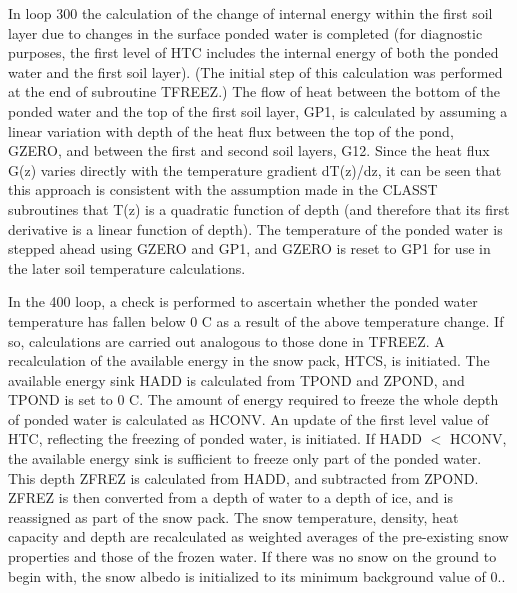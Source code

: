 In loop 300 the calculation of the change of internal energy within the first soil layer due to changes in the surface ponded water is completed (for diagnostic purposes, the first level of H\+T\+C includes the internal energy of both the ponded water and the first soil layer). (The initial step of this calculation was performed at the end of subroutine T\+F\+R\+E\+E\+Z.) The flow of heat between the bottom of the ponded water and the top of the first soil layer, G\+P1, is calculated by assuming a linear variation with depth of the heat flux between the top of the pond, G\+Z\+E\+R\+O, and between the first and second soil layers, G12. Since the heat flux G(z) varies directly with the temperature gradient d\+T(z)/dz, it can be seen that this approach is consistent with the assumption made in the C\+L\+A\+S\+S\+T subroutines that T(z) is a quadratic function of depth (and therefore that its first derivative is a linear function of depth). The temperature of the ponded water is stepped ahead using G\+Z\+E\+R\+O and G\+P1, and G\+Z\+E\+R\+O is reset to G\+P1 for use in the later soil temperature calculations.

In the 400 loop, a check is performed to ascertain whether the ponded water temperature has fallen below 0 C as a result of the above temperature change. If so, calculations are carried out analogous to those done in T\+F\+R\+E\+E\+Z. A recalculation of the available energy in the snow pack, H\+T\+C\+S, is initiated. The available energy sink H\+A\+D\+D is calculated from T\+P\+O\+N\+D and Z\+P\+O\+N\+D, and T\+P\+O\+N\+D is set to 0 C. The amount of energy required to freeze the whole depth of ponded water is calculated as H\+C\+O\+N\+V. An update of the first level value of H\+T\+C, reflecting the freezing of ponded water, is initiated. If H\+A\+D\+D $<$ H\+C\+O\+N\+V, the available energy sink is sufficient to freeze only part of the ponded water. This depth Z\+F\+R\+E\+Z is calculated from H\+A\+D\+D, and subtracted from Z\+P\+O\+N\+D. Z\+F\+R\+E\+Z is then converted from a depth of water to a depth of ice, and is reassigned as part of the snow pack. The snow temperature, density, heat capacity and depth are recalculated as weighted averages of the pre-\/existing snow properties and those of the frozen water. If there was no snow on the ground to begin with, the snow albedo is initialized to its minimum background value of 0..

